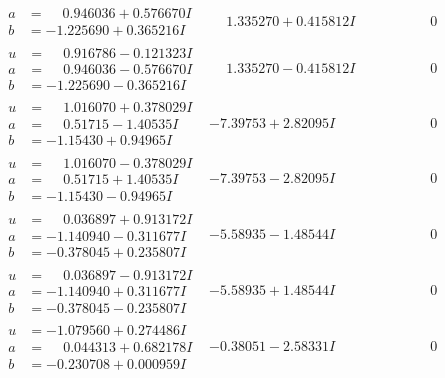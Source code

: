\documentclass[1p]{elsarticle_modified}
\theoremstyle{definition}
\begin{document}
$$\begin{array}{c|c|c}
\begin{aligned}
a &= \phantom{-}0.946036 + 0.576670 I \\
b &= -1.225690 + 0.365216 I\end{aligned}
 & \phantom{-}1.335270 + 0.415812 I & \phantom{-0.000000 } 0 \\ \hline\begin{aligned}
u &= \phantom{-}0.916786 - 0.121323 I \\
a &= \phantom{-}0.946036 - 0.576670 I \\
b &= -1.225690 - 0.365216 I\end{aligned}
 & \phantom{-}1.335270 - 0.415812 I & \phantom{-0.000000 } 0 \\ \hline\begin{aligned}
u &= \phantom{-}1.016070 + 0.378029 I \\
a &= \phantom{-}0.51715 - 1.40535 I \\
b &= -1.15430 + 0.94965 I\end{aligned}
 & -7.39753 + 2.82095 I & \phantom{-0.000000 } 0 \\ \hline\begin{aligned}
u &= \phantom{-}1.016070 - 0.378029 I \\
a &= \phantom{-}0.51715 + 1.40535 I \\
b &= -1.15430 - 0.94965 I\end{aligned}
 & -7.39753 - 2.82095 I & \phantom{-0.000000 } 0 \\ \hline\begin{aligned}
u &= \phantom{-}0.036897 + 0.913172 I \\
a &= -1.140940 - 0.311677 I \\
b &= -0.378045 + 0.235807 I\end{aligned}
 & -5.58935 - 1.48544 I & \phantom{-0.000000 } 0 \\ \hline\begin{aligned}
u &= \phantom{-}0.036897 - 0.913172 I \\
a &= -1.140940 + 0.311677 I \\
b &= -0.378045 - 0.235807 I\end{aligned}
 & -5.58935 + 1.48544 I & \phantom{-0.000000 } 0 \\ \hline\begin{aligned}
u &= -1.079560 + 0.274486 I \\
a &= \phantom{-}0.044313 + 0.682178 I \\
b &= -0.230708 + 0.000959 I\end{aligned}
 & -0.38051 - 2.58331 I & \phantom{-0.000000 } 0 \\ \hline\begin{aligned}

\end{aligned}
\end{array}$$
\end{document}
